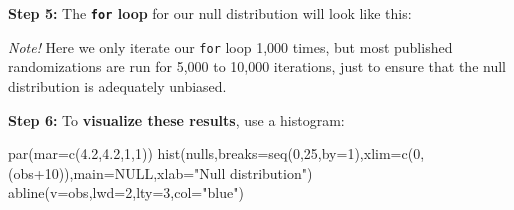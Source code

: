 \documentclass[
]{book}
\newenvironment{Shaded}{\begin{snugshade}}{\end{snugshade}}
\newcommand{\AttributeTok}[1]{\textcolor[rgb]{0.77,0.63,0.00}{#1}}
\newcommand{\CommentTok}[1]{\textcolor[rgb]{0.56,0.35,0.01}{\textit{#1}}}
\newcommand{\ConstantTok}[1]{\textcolor[rgb]{0.00,0.00,0.00}{#1}}
\newcommand{\ControlFlowTok}[1]{\textcolor[rgb]{0.13,0.29,0.53}{\textbf{#1}}}
\newcommand{\DecValTok}[1]{\textcolor[rgb]{0.00,0.00,0.81}{#1}}
\newcommand{\FloatTok}[1]{\textcolor[rgb]{0.00,0.00,0.81}{#1}}
\newcommand{\FunctionTok}[1]{\textcolor[rgb]{0.00,0.00,0.00}{#1}}
\newcommand{\NormalTok}[1]{#1}
\newcommand{\OtherTok}[1]{\textcolor[rgb]{0.56,0.35,0.01}{#1}}
\newcommand{\SpecialCharTok}[1]{\textcolor[rgb]{0.00,0.00,0.00}{#1}}
\newcommand{\StringTok}[1]{\textcolor[rgb]{0.31,0.60,0.02}{#1}}
\begin{document}
\textbf{Step 5:} The \textbf{\texttt{for} loop} for our null distribution will look like this:

\begin{Shaded}
\end{Shaded}

\emph{Note!} Here we only iterate our \texttt{for} loop 1,000 times, but most published randomizations are run for 5,000 to 10,000 iterations, just to ensure that the null distribution is adequately unbiased.

\textbf{Step 6:} To \textbf{visualize these results}, use a histogram:

\begin{Shaded}
\begin{Highlighting}[]
\FunctionTok{par}\NormalTok{(}\AttributeTok{mar=}\FunctionTok{c}\NormalTok{(}\FloatTok{4.2}\NormalTok{,}\FloatTok{4.2}\NormalTok{,}\DecValTok{1}\NormalTok{,}\DecValTok{1}\NormalTok{))}
\FunctionTok{hist}\NormalTok{(nulls,}\AttributeTok{breaks=}\FunctionTok{seq}\NormalTok{(}\DecValTok{0}\NormalTok{,}\DecValTok{25}\NormalTok{,}\AttributeTok{by=}\DecValTok{1}\NormalTok{),}\AttributeTok{xlim=}\FunctionTok{c}\NormalTok{(}\DecValTok{0}\NormalTok{,(obs}\SpecialCharTok{+}\DecValTok{10}\NormalTok{)),}\AttributeTok{main=}\ConstantTok{NULL}\NormalTok{,}\AttributeTok{xlab=}\StringTok{"Null distribution"}\NormalTok{)}
\FunctionTok{abline}\NormalTok{(}\AttributeTok{v=}\NormalTok{obs,}\AttributeTok{lwd=}\DecValTok{2}\NormalTok{,}\AttributeTok{lty=}\DecValTok{3}\NormalTok{,}\AttributeTok{col=}\StringTok{"blue"}\NormalTok{)}
\end{Highlighting}
\end{Shaded}
\end{document}
